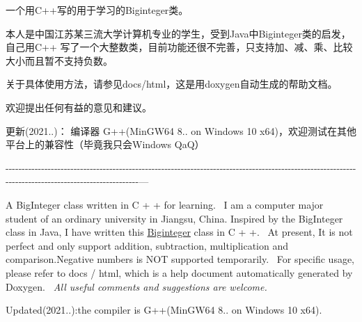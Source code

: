 一个用\+C++写的用于学习的\+Biginteger类。

本人是中国江苏某三流大学计算机专业的学生，受到\+Java中\+Biginteger类的启发，自己用\+C++ 写了一个大整数类，目前功能还很不完善，只支持加、减、乘、比较大小而且暂不支持负数。

关于具体使用方法，请参见docs/html，这是用doxygen自动生成的帮助文档。

欢迎提出任何有益的意见和建议。

更新(2021..)： 编译器 G++(Min\+GW64 8.. on Windows 10 x64)，欢迎测试在其他平台上的兼容性（毕竟我只会\+Windows Qa\+Q） 

-\/-\/-\/-\/-\/-\/-\/-\/-\/-\/-\/-\/-\/-\/-\/-\/-\/-\/-\/-\/-\/-\/-\/-\/-\/-\/-\/-\/-\/-\/-\/-\/-\/-\/-\/-\/-\/-\/-\/-\/-\/-\/-\/-\/-\/-\/-\/-\/-\/-\/-\/-\/-\/-\/-\/-\/-\/-\/-\/-\/-\/-\/-\/-\/-\/-\/-\/-\/-\/-\/-\/-\/-\/-\/-\/-\/-\/-\/-\/-\/-\/-\/-\/-\/-\/-\/-\/-\/-\/-\/-\/-\/-\/-\/-\/-\/-\/-\/-\/-\/-\/-\/-\/-\/-\/-\/-\/-\/-\/-\/-\/-\/-\/-\/-\/-\/-\/-\/-\/-\/-\/-\/-\/-\/-\/-\/-\/-\/-\/-\/-\/-\/-\/-\/-\/-\/-\/-\/-\/-\/-\/-\/-\/-\/-\/-\/-\/-\/-\/---

A Big\+Integer class written in C + + for learning.~\newline
 I am a computer major student of an ordinary university in Jiangsu, China. Inspired by the Big\+Integer class in Java, I have written this \mbox{\hyperlink{class_biginteger}{Biginteger}} class in C + +.~\newline
 At present, It is not perfect and only support addition, subtraction, multiplication and comparison.\+Negative numbers is NOT supported temporarily.~\newline
 For specific usage, please refer to docs / html, which is a help document automatically generated by Doxygen.~\newline
 {\itshape All useful comments and suggestions are welcome.} 

Updated(2021..)\+:the compiler is G++(Min\+GW64 8.. on Windows 10 x64).